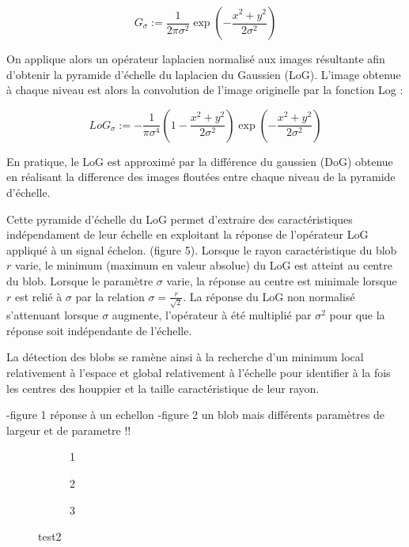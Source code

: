 \documentclass{article}
\begin{document}
	\[G_{\sigma}:=\frac{1}{2\pi\sigma^{2}}\exp(-\frac{x^{2}+y^{2}}{2\sigma^{2}})\]

	On applique alors un opérateur laplacien normalisé aux images résultante afin d'obtenir la pyramide d'échelle du laplacien du Gaussien (LoG). L'image obtenue à chaque niveau est alors la convolution de l'image originelle par la fonction Log :


	\[{LoG}_{\sigma}:=-\frac{1}{\pi\sigma^{4}}(1-\frac{x^{2}+y^{2}}{2\sigma^{2}})\exp(-\frac{x^{2}+y^{2}}{2\sigma^{2}})\] 

	En pratique, le LoG est approximé par la différence du gaussien (DoG) obtenue en réalisant la difference des images floutées entre chaque niveau de la pyramide d'échelle.  

	Cette pyramide d'échelle du LoG permet d'extraire des caractéristiques indépendament de leur échelle en exploitant la réponse de l'opérateur LoG appliqué à un signal échelon. (figure 5). Lorsque le rayon caractéristique du blob $r$ varie, le minimum (maximum en valeur absolue) du LoG est atteint au centre du blob. Lorsque le paramètre $\sigma$ varie, la réponse au centre est minimale lorsque $r$ est relié à $\sigma$ par la relation $\sigma=\frac{r}{\sqrt{2}}$. La réponse du LoG non normalisé s'attenuant lorsque $\sigma$ augmente, l'opérateur à été multiplié par $\sigma^{2}$ pour que la réponse soit indépendante de l'échelle.

	La détection des blobs se ramène ainsi à la recherche d'un minimum local relativement à l'espace et global relativement à l'échelle pour identifier à la fois les centres des houppier et la taille caractéristique de leur rayon. 
	
	-figure 1 réponse à un echellon 
	-figure 2 un blob mais différents paramètres de largeur et de parametre !!

\begin{figure}
	\centering
	\begin{subfigure}{.5\textwidth}
		\centering
		\caption{1}
	\end{subfigure}
	\begin{subfigure}{.5\textwidth}
		\centering
		\caption{2}
	\end{subfigure}
	\begin{subfigure}{.5\textwidth}
		\centering
		\caption{3}
	\end{subfigure}
	\caption{test2}
\end{figure}
\end{document}
